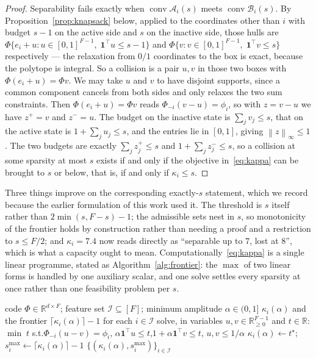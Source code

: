 \documentclass[preprint,12pt]{elsarticle}
\theoremstyle{definition}
\newcommand{\R}{\mathbb{R}}
\newcommand{\norm}[1]{\left\lVert #1 \right\rVert}
\begin{document}
\begin{proof}
Separability fails exactly when $\operatorname{conv}\mathcal A_i(s)$ meets
$\operatorname{conv}\mathcal B_i(s)$. By Proposition~\ref{prop:knapsack} below, applied to the
coordinates other than $i$ with budget $s-1$ on the active side and $s$ on the inactive side,
those hulls are $\Phi\{e_i+u:u\in[0,1]^{F-1},\;\mathbf 1^{\top}u\le s-1\}$ and
$\Phi\{v:v\in[0,1]^{F-1},\;\mathbf 1^{\top}v\le s\}$ respectively --- the relaxation from
$0/1$ coordinates to the box is exact, because the polytope is integral. So a collision is a
pair $u,v$ in those two boxes with $\Phi(e_i+u)=\Phi v$. We may take $u$ and $v$ to have
disjoint supports, since a common component cancels from both sides and only relaxes the two sum
constraints. Then
$\Phi(e_i+u)=\Phi v$ reads $\Phi_{-i}(v-u)=\phi_i$, so with $z=v-u$ we have $z^{+}=v$ and
$z^{-}=u$. The budget on the inactive state is $\sum_j v_j\le s$, that on the active state is
$1+\sum_j u_j\le s$, and the entries lie in $[0,1]$, giving $\norm{z}_\infty\le1$. The two
budgets are exactly $\sum_jz^{+}_j\le s$ and $1+\sum_jz^{-}_j\le s$, so a collision at some
sparsity at most $s$ exists if and only if the objective in~\eqref{eq:kappa} can be brought to
$s$ or below, that is, if and only if $\kappa_i\le s$.
\end{proof}

Three things improve on the corresponding exactly-$s$ statement, which we record because the
earlier formulation of this work used it. The threshold is $s$ itself rather than
$2\min(s,F-s)-1$; the admissible sets nest in $s$, so monotonicity of the frontier holds by
construction rather than needing a proof and a restriction to $s\le F/2$; and $\kappa_i=7.4$ now
reads directly as ``separable up to $7$, lost at $8$'', which is what a capacity ought to mean.
Computationally~\eqref{eq:kappa} is a single linear programme, stated as
Algorithm~\ref{alg:frontier}: the $\max$ of two linear forms is handled by one auxiliary scalar,
and one solve settles every sparsity at once rather than one feasibility problem per $s$.

\begin{algorithm}[t]
\caption{\textsc{CollisionFrontier} --- the largest affinely separable sparsity, per feature}
\label{alg:frontier}
\begin{algorithmic}[1]
\Require code $\Phi\in\R^{d\times F}$; feature set $\mathcal I\subseteq[F]$; minimum amplitude
  $\alpha\in(0,1]$
\Ensure $\kappa_i(\alpha)$ and the frontier $\lceil\kappa_i(\alpha)\rceil-1$ for each
  $i\in\mathcal I$
  \State solve, in variables $u,v\in\R^{F-1}_{\ge0}$ and $t\in\R$:
  \Statex \qquad $\min\;t$ \quad s.t.\quad $\Phi_{-i}(u-v)=\phi_i$,\quad
    $\alpha\mathbf 1^{\top}u\le t$,\quad $1+\alpha\mathbf 1^{\top}v\le t$,\quad
    $u,v\le1/\alpha$
  \State $\kappa_i(\alpha)\gets t^{\star}$;\quad
    $s_i^{\max}\gets\lceil\kappa_i(\alpha)\rceil-1$
\EndFor
\State \Return $\{(\kappa_i(\alpha),s_i^{\max})\}_{i\in\mathcal I}$
\end{algorithmic}
\end{algorithm}
\end{document}
